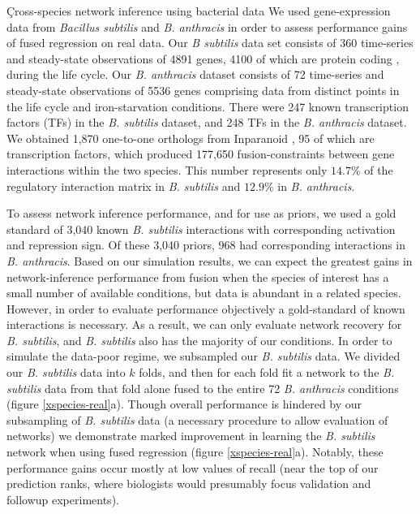 \documentclass[11pt]{article}
\begin{document}
\c{Cross-species network inference using bacterial data}
We used gene-expression data from \textit{Bacillus subtilis} and \textit{B. anthracis} in order to assess performance gains of fused regression on real data. 
Our \textit{B subtilis} data set consists of 360 time-series and steady-state observations of 4891 genes, 4100 of which are protein coding \cite{kunst_complete_1997}, during the life cycle.
Our \textit{\textit{B. anthracis}} dataset consists of 72 time-series and steady-state observations of 5536 genes comprising data from distinct points in the life cycle and iron-starvation conditions. 
There were 247 known transcription factors (TFs) in the \textit{\textit{B. subtilis}} dataset, and 248 TFs in the \textit{B. anthracis} dataset.
We obtained 1,870 one-to-one orthologs from Inparanoid \cite{ostlund_inparanoid_2010}, 95 of which are transcription factors, which produced 177,650 fusion-constraints between gene interactions within the two species. 
This number represents only $14.7\%$ of the regulatory interaction matrix in \textit{B. subtilis} and $12.9\%$ in \textit{B. anthracis}. 

To assess network inference performance, and for use as priors, we used a gold standard of 3,040 known \textit{B. subtilis} interactions with corresponding activation and repression sign. 
Of these 3,040 priors, 968 had corresponding interactions in \textit{B. anthracis}. 
Based on our simulation results, we can expect the greatest gains in network-inference performance from fusion when the species of interest has a small number of available conditions, but data is abundant in a related species. 
However, in order to evaluate performance objectively a gold-standard of known interactions is necessary. 
As a result, we can only evaluate network recovery for \textit{B. subtilis}, and \textit{B. subtilis} also has the majority of our conditions. 
In order to simulate the data-poor regime, we subsampled our \textit{B. subtilis} data. 
We divided our \textit{B. subtilis} data into $k$ folds, and then for each fold fit a network to the \textit{B. subtilis} data from that fold alone fused to the entire 72 \textit{B. anthracis} conditions (figure \ref{xspecies-real}a). 
Though overall performance is hindered by our subsampling of \textit{B. subtilis} data (a necessary procedure to allow evaluation of networks) we demonstrate marked improvement in learning the \textit{B. subtilis} network when using fused regression (figure \ref{xspecies-real}a). 
Notably, these performance gains occur mostly at low values of recall (near the top of our prediction ranks, where biologists would presumably focus validation and followup experiments). 
\end{document}
